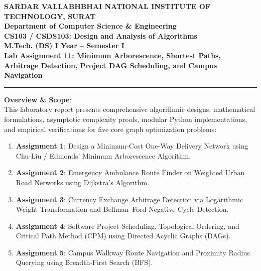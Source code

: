 \documentclass[12pt]{article}
\begin{document}
\begin{center}
\textbf{\Large SARDAR VALLABHBHAI NATIONAL INSTITUTE OF TECHNOLOGY, SURAT}\\[4pt]
\textbf{\large Department of Computer Science \& Engineering}\\[3pt]
\textbf{\large CS103 / CSDS103: Design and Analysis of Algorithms}\\[3pt]
\textbf{\large M.Tech. (DS) I Year -- Semester I}\\[4pt]
\textbf{\Large Lab Assignment 11: Minimum Arborescence, Shortest Paths, Arbitrage Detection, Project DAG Scheduling, and Campus Navigation}
\end{center}

\vspace{0.2cm}
\hrule
\vspace{0.4cm}

\textbf{Overview \& Scope}:\\
This laboratory report presents comprehensive algorithmic designs, mathematical formulations, asymptotic complexity proofs, modular Python implementations, and empirical verifications for five core graph optimization problems:
\begin{enumerate}
    \item \textbf{Assignment 1}: Design a Minimum-Cost One-Way Delivery Network using Chu-Liu / Edmonds' Minimum Arborescence Algorithm.
    \item \textbf{Assignment 2}: Emergency Ambulance Route Finder on Weighted Urban Road Networks using Dijkstra's Algorithm.
    \item \textbf{Assignment 3}: Currency Exchange Arbitrage Detection via Logarithmic Weight Transformation and Bellman--Ford Negative Cycle Detection.
    \item \textbf{Assignment 4}: Software Project Scheduling, Topological Ordering, and Critical Path Method (CPM) using Directed Acyclic Graphs (DAGs).
    \item \textbf{Assignment 5}: Campus Walkway Route Navigation and Proximity Radius Querying using Breadth-First Search (BFS).
\end{enumerate}

\vspace{0.3cm}

\end{document}
